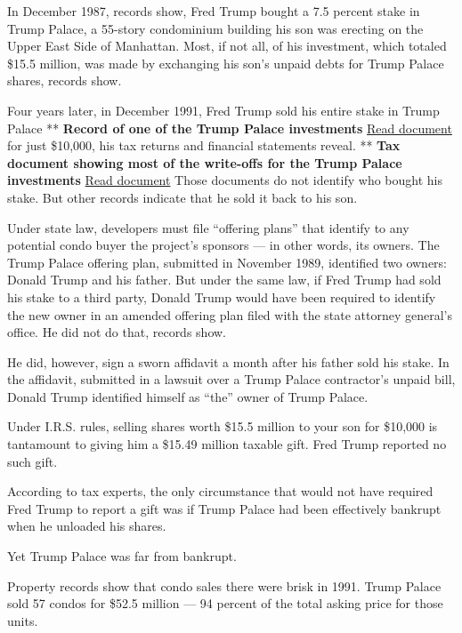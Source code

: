 In December 1987, records show, Fred Trump bought a 7.5 percent stake in
Trump Palace, a 55-story condominium building his son was erecting on
the Upper East Side of Manhattan. Most, if not all, of his investment,
which totaled \$15.5 million, was made by exchanging his son's unpaid
debts for Trump Palace shares, records show.

Four years later, in December 1991, Fred Trump sold his entire stake in
Trump Palace ** \textbf{Record of one of the Trump Palace investments}
\href{https://int.nyt.com/data/documenthelper/136-trump-palace-sussex-hall/8743f02a6c559ca84022/optimized/full.pdf\#page=1}{Read
document} for just \$10,000, his tax returns and financial statements
reveal. ** \textbf{Tax document showing most of the write-offs for the
Trump Palace investments}
\href{https://int.nyt.com/data/documenthelper/281-trump-palace-fred-trump-1991/75834079e4ada8981806/optimized/full.pdf\#page=1}{Read
document} Those documents do not identify who bought his stake. But
other records indicate that he sold it back to his son.

Under state law, developers must file ``offering plans'' that identify
to any potential condo buyer the project's sponsors --- in other words,
its owners. The Trump Palace offering plan, submitted in November 1989,
identified two owners: Donald Trump and his father. But under the same
law, if Fred Trump had sold his stake to a third party, Donald Trump
would have been required to identify the new owner in an amended
offering plan filed with the state attorney general's office. He did not
do that, records show.

He did, however, sign a sworn affidavit a month after his father sold
his stake. In the affidavit, submitted in a lawsuit over a Trump Palace
contractor's unpaid bill, Donald Trump identified himself as ``the''
owner of Trump Palace.

Under I.R.S. rules, selling shares worth \$15.5 million to your son for
\$10,000 is tantamount to giving him a \$15.49 million taxable gift.
Fred Trump reported no such gift.

According to tax experts, the only circumstance that would not have
required Fred Trump to report a gift was if Trump Palace had been
effectively bankrupt when he unloaded his shares.

Yet Trump Palace was far from bankrupt.

Property records show that condo sales there were brisk in 1991. Trump
Palace sold 57 condos for \$52.5 million --- 94 percent of the total
asking price for those units.

